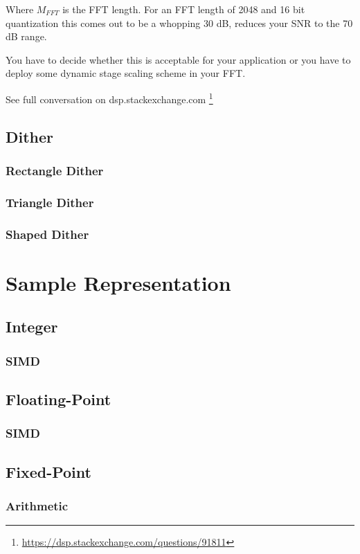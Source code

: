 \documentclass[oneside]{report}
\begin{document}
Where $M_{FFT}$ is the FFT length. For an FFT length of 2048 and 16 bit
quantization this comes out to be a whopping 30 dB, reduces your SNR to the
70 dB range.

You have to decide whether this is acceptable for your application or you have
to deploy some dynamic stage scaling scheme in your FFT.

See full conversation on dsp.stackexchange.com
\footnote{\url{https://dsp.stackexchange.com/questions/91811}}

\section{Dither}
\subsection{Rectangle Dither}
\subsection{Triangle Dither}
\subsection{Shaped Dither}

\chapter{Sample Representation}

\section{Integer}
\subsection{SIMD}

\section{Floating-Point}
\subsection{SIMD}

\section{Fixed-Point}

\subsection{Arithmetic}
\end{document}
